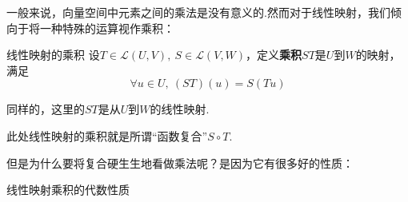 \documentclass[lang=cn, zihao=5]{elegantbook}
\newcommand{\lmap}{\mathcal{L}}
\begin{document}
一般来说，向量空间中元素之间的乘法是没有意义的.然而对于线性映射，我们倾向于将一种特殊的运算视作乘积：

\begin{definition}{线性映射的乘积}
	设$T \in \lmap (U,V),~S \in \lmap (V,W)$，定义\textbf{乘积}$ST$是$U$到$W$的映射，满足$$\forall u \in U,~(ST)(u)=S(Tu)$$
\end{definition}
\begin{remark}
	同样的，这里的$ST$是从$U$到$W$的线性映射.
\end{remark}
\begin{remark}
	此处线性映射的乘积就是所谓“函数复合”$S \circ T$.
\end{remark}

但是为什么要将复合硬生生地看做乘法呢？是因为它有很多好的性质：

\begin{proposition}{线性映射乘积的代数性质}
	
\end{proposition}
\end{document}
